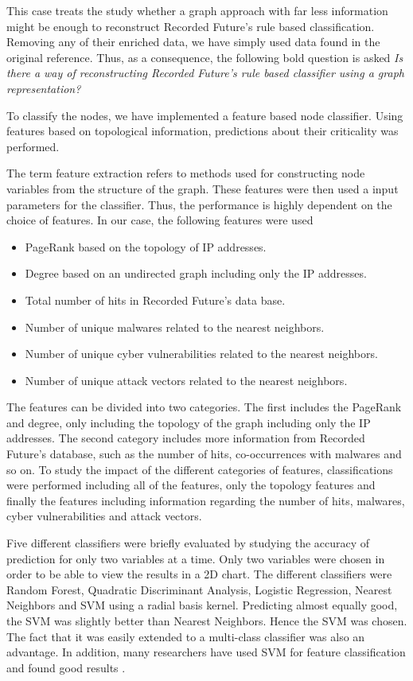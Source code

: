 This case treats the study whether a graph approach with far less information might be enough to reconstruct Recorded Future's rule based classification. Removing any of their enriched data, we have simply used data found in the original reference. Thus, as a consequence, the following bold question is asked \textit{Is there a way of reconstructing Recorded Future's rule based classifier using a graph representation?} 

To classify the nodes, we have implemented a feature based node classifier. Using features based on topological information, predictions about their criticality was performed.

The term feature extraction refers to methods used for constructing node variables from the structure of the graph. These features were then used a input parameters for the classifier. Thus, the performance is highly dependent on the choice of features. In our case, the following features were used
\begin{itemize}
    \item PageRank based on the topology of IP addresses.
    \item Degree based on an undirected graph including only the IP addresses.
    \item Total number of hits in Recorded Future's data base.
    \item Number of unique malwares related to the nearest neighbors.
    \item Number of unique cyber vulnerabilities related to the nearest neighbors.
    \item Number of unique attack vectors related to the nearest neighbors.
\end{itemize}

The features can be divided into two categories. The first includes the PageRank and degree, only including the topology of the graph including only the IP addresses. The second category includes more information from Recorded Future's database, such as the number of hits, co-occurrences with malwares and so on. To study the impact of the different categories of features, classifications were performed including all of the features, only the topology features and finally the features including information regarding the number of hits, malwares, cyber vulnerabilities and attack vectors.

Five different classifiers were briefly evaluated by studying the accuracy of prediction for only two variables at a time. Only two variables were chosen in order to be able to view the results in a 2D chart. The different classifiers were Random Forest, Quadratic Discriminant Analysis, Logistic Regression, Nearest Neighbors and SVM using a radial basis kernel. Predicting almost equally good, the SVM was slightly better than Nearest Neighbors. Hence the SVM was chosen. The fact that it was easily extended to a multi-class classifier was also an advantage. In addition, many researchers have used SVM for feature classification and found good results \citep{campbell2011}.


